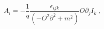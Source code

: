 \begin{equation}
A_{i}=-\frac{1}{q}\frac{\epsilon _{ijk}}{\left( -O^{2}\partial
^{2}+m^{2}\right) }O\partial _{j}I_{k}\;,  \label{vreg}
\end{equation}

